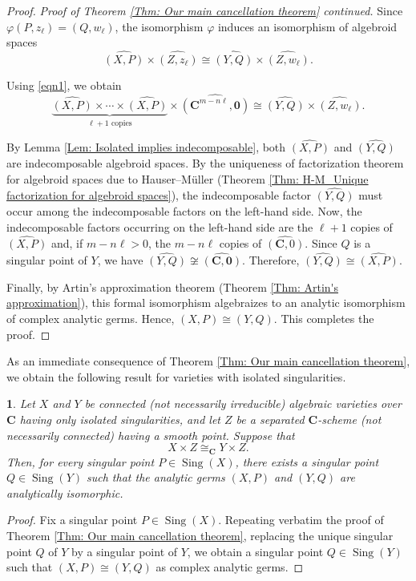 \documentclass[english,10pt,reqno,twoside]{amsart}
\numberwithin{equation}{section}
\numberwithin{figure}{section}
\theoremstyle{plain}
\theoremstyle{plain}
\newtheorem{cor}[thm]{\protect\corollaryname}
\theoremstyle{definition}
\providecommand{\corollaryname}{Corollary}
\theoremstyle{plain}
\numberwithin{equation}{section}
\newcommand{\C}{\mathbf{C}}
\newcommand{\oo}{\mathbf{0}}
\newcommand{\Sing}{\operatorname{Sing}}
\begin{document}
\begin{proof}
\medskip

\textit{Proof of Theorem \ref{Thm: Our main cancellation theorem} continued.}
Since $\varphi(P,z_\ell)=(Q,w_\ell)$, the isomorphism $\varphi$ induces an isomorphism of algebroid spaces
\[
\widehat{(X,P)}
\times
\widehat{(Z,z_\ell)}
\cong
\widehat{(Y,Q)}
\times
\widehat{(Z,w_\ell)}.
\]

Using \eqref{eqn1}, we obtain
\[
\underbrace{\widehat{(X,P)}\times \cdots \times \widehat{(X,P)}}_{\ell+1\text{ copies}}
\times
\widehat{(\C^{m-n\ell},\oo)}
\cong
\widehat{(Y,Q)}
\times
\widehat{(Z,w_\ell)}.
\]

By Lemma \ref{Lem: Isolated implies indecomposable}, both $\widehat{(X,P)}$ and $\widehat{(Y,Q)}$ are indecomposable algebroid spaces. By the uniqueness of factorization theorem for algebroid spaces due to Hauser--M\"uller (Theorem \ref{Thm: H-M_Unique factorization for algebroid spaces}), the indecomposable factor $\widehat{(Y,Q)}$ must occur among the indecomposable factors on the left-hand side. Now, the indecomposable factors occurring on the left-hand side are the $\ell+1$ copies of $\widehat{(X,P)}$ and, if $m-n\ell>0$, the $m-n\ell$ copies of $\widehat{(\C,0)}$. Since $Q$ is a singular point of $Y$, we have
$\widehat{(Y,Q)}\not\cong\widehat{(\C,\oo)}$. Therefore, $\widehat{(Y,Q)}\cong \widehat{(X,P)}$.

Finally, by Artin's approximation theorem (Theorem \ref{Thm: Artin's approximation}), this formal isomorphism algebraizes to an analytic isomorphism of complex analytic germs. Hence, $(X,P)\cong (Y,Q)$. This completes the proof.
\end{proof}

As an immediate consequence of Theorem \ref{Thm: Our main cancellation theorem}, we obtain the following result for varieties with isolated singularities.

\begin{cor}\label{Cor: Cancellation theorem for isolated singularities}
Let $X$ and $Y$ be connected (not necessarily irreducible) algebraic varieties over $\C$ having only isolated singularities, and let $Z$ be a separated $\C$-scheme (not necessarily connected) having a smooth point. Suppose that
\[
X\times Z \cong_{\C} Y\times Z.
\]
Then, for every singular point $P\in \Sing(X)$, there exists a singular point $Q\in \Sing(Y)$ such that the analytic germs $(X,P)$ and $(Y,Q)$ are analytically isomorphic.
\end{cor}

\begin{proof}
Fix a singular point $P\in \Sing(X)$. Repeating verbatim the proof of Theorem \ref{Thm: Our main cancellation theorem}, replacing the unique singular point $Q$ of $Y$ by a singular point of $Y$, we obtain a singular point $Q\in \Sing(Y)$ such that $(X,P)\cong (Y,Q)$ as complex analytic germs.
\end{proof}
\end{document}
